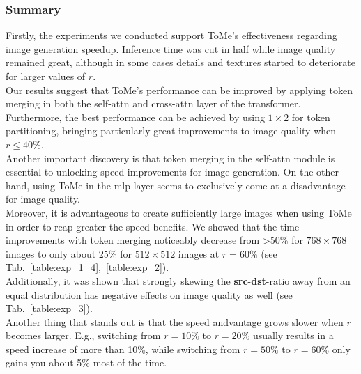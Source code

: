 \subsubsection*{Summary}
Firstly, the experiments we conducted support ToMe's effectiveness regarding image generation speedup. Inference time was cut in half while image quality remained great, although in some cases details and textures started to deteriorate for larger values of \(r\).\\
Our results suggest that ToMe's performance can be improved by applying token merging in both the self-attn and cross-attn layer of the transformer. Furthermore, the best performance can be achieved by using $1 \times 2$ for token partitioning, bringing particularly great improvements to image quality when \(r\leq40\%\).\\
Another important discovery is that token merging in the self-attn module is essential to unlocking speed improvements for image generation. On the other hand, using ToMe in the mlp layer seems to exclusively come at a disadvantage for image quality.\\
Moreover, it is advantageous to create sufficiently large images when using ToMe in order to reap greater the speed benefits. We showed that the time improvements with token merging noticeably decrease from >50\% for $768 \times 768$ images to only about 25\% for $512 \times 512$ images at \(r=60\%\) (see Tab.~\ref{table:exp_1_4},~\ref{table:exp_2}).\\
Additionally, it was shown that strongly skewing the \textbf{src}-\textbf{dst}-ratio away from an equal distribution has negative effects on image quality as well (see Tab.~\ref{table:exp_3}).\\
Another thing that stands out is that the speed andvantage grows slower when \(r\) becomes larger. E.g., switching from \(r=10\%\) to \(r=20\%\) usually results in a speed increase of more than 10\%, while switching from \(r=50\%\) to \(r=60\%\) only gains you about 5\% most of the time.
